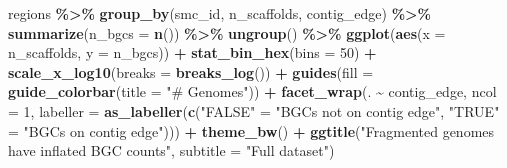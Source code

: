 \documentclass[
]{article}
\newenvironment{Shaded}{\begin{snugshade}}{\end{snugshade}}
\newcommand{\AttributeTok}[1]{\textcolor[rgb]{0.13,0.29,0.53}{#1}}
\newcommand{\DecValTok}[1]{\textcolor[rgb]{0.00,0.00,0.81}{#1}}
\newcommand{\FunctionTok}[1]{\textcolor[rgb]{0.13,0.29,0.53}{\textbf{#1}}}
\newcommand{\NormalTok}[1]{#1}
\newcommand{\OtherTok}[1]{\textcolor[rgb]{0.56,0.35,0.01}{#1}}
\newcommand{\SpecialCharTok}[1]{\textcolor[rgb]{0.81,0.36,0.00}{\textbf{#1}}}
\newcommand{\StringTok}[1]{\textcolor[rgb]{0.31,0.60,0.02}{#1}}
\begin{document}
\begin{Shaded}
\begin{Highlighting}[]
\NormalTok{regions }\SpecialCharTok{\%\textgreater{}\%}
  \FunctionTok{group\_by}\NormalTok{(smc\_id, n\_scaffolds, contig\_edge) }\SpecialCharTok{\%\textgreater{}\%}
  \FunctionTok{summarize}\NormalTok{(}\AttributeTok{n\_bgcs =} \FunctionTok{n}\NormalTok{()) }\SpecialCharTok{\%\textgreater{}\%}
  \FunctionTok{ungroup}\NormalTok{() }\SpecialCharTok{\%\textgreater{}\%}
  \FunctionTok{ggplot}\NormalTok{(}\FunctionTok{aes}\NormalTok{(}\AttributeTok{x =}\NormalTok{ n\_scaffolds, }\AttributeTok{y =}\NormalTok{ n\_bgcs)) }\SpecialCharTok{+}
  \FunctionTok{stat\_bin\_hex}\NormalTok{(}\AttributeTok{bins =} \DecValTok{50}\NormalTok{) }\SpecialCharTok{+}
  \FunctionTok{scale\_x\_log10}\NormalTok{(}\AttributeTok{breaks =} \FunctionTok{breaks\_log}\NormalTok{()) }\SpecialCharTok{+}
  \FunctionTok{guides}\NormalTok{(}\AttributeTok{fill =} \FunctionTok{guide\_colorbar}\NormalTok{(}\AttributeTok{title =} \StringTok{"\# Genomes"}\NormalTok{)) }\SpecialCharTok{+}
  \FunctionTok{facet\_wrap}\NormalTok{(. }\SpecialCharTok{\textasciitilde{}}\NormalTok{ contig\_edge, }\AttributeTok{ncol =} \DecValTok{1}\NormalTok{, }\AttributeTok{labeller =} \FunctionTok{as\_labeller}\NormalTok{(}\FunctionTok{c}\NormalTok{(}\StringTok{"FALSE"} \OtherTok{=} \StringTok{"BGCs not on contig edge"}\NormalTok{, }\StringTok{"TRUE"} \OtherTok{=} \StringTok{"BGCs on contig edge"}\NormalTok{))) }\SpecialCharTok{+}
  \FunctionTok{theme\_bw}\NormalTok{() }\SpecialCharTok{+}
  \FunctionTok{ggtitle}\NormalTok{(}\StringTok{"Fragmented genomes have inflated BGC counts"}\NormalTok{, }\AttributeTok{subtitle =} \StringTok{"Full dataset"}\NormalTok{)}
\end{Highlighting}
\end{Shaded}
\end{document}
